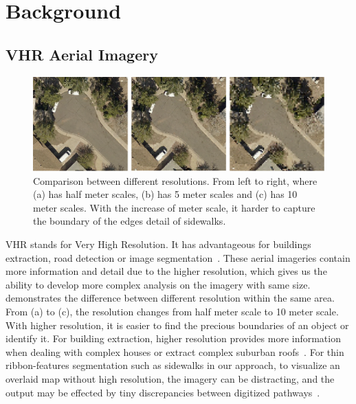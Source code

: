 \chapter{Background}


\section{\ac{VHR} Aerial Imagery}

\begin{figure}[H]
    \centering
    \includegraphics[width=\textwidth]{Figures/arz_7_res_compare.png}
    \caption[Resolution Comparison]{Comparison between different resolutions. From left to right, where (a) has half meter scales, (b) has 5 meter scales and (c) has 10 meter scales. With the increase of meter scale, it harder to capture the boundary of the edges detail of sidewalks.}
    \label{fig:vhr_compare}
\end{figure}

\ac{VHR} stands for Very High Resolution. It has advantageous for buildings extraction, road detection or image segmentation~\cite{FREIRE20141, 10.1007/BFb0015525, 10.1007/978-3-642-15567-3_16}. 
These aerial imageries contain more information and detail due to the higher resolution, which gives us the ability to develop more complex analysis on the imagery with same size.
 demonstrates the difference between different resolution within the same area. From (a) to (c), the resolution changes from half meter scale to 10 meter scale. 
With higher resolution, it is easier to find the precious boundaries of an object or identify it. 
For building extraction, higher resolution provides more information when dealing with complex houses or extract complex suburban roofs~\cite{10.1007/BFb0015525}. 
For thin ribbon-features segmentation such as sidewalks in our approach, to visualize an overlaid map without high resolution, the imagery can be distracting, and the output may be effected by tiny discrepancies between digitized pathways~\cite{10.1007/978-3-642-15567-3_16}. 

